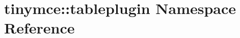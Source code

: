 \hypertarget{namespacetinymce_1_1tableplugin}{\section{tinymce\+:\+:tableplugin Namespace Reference}
\label{namespacetinymce_1_1tableplugin}
}
